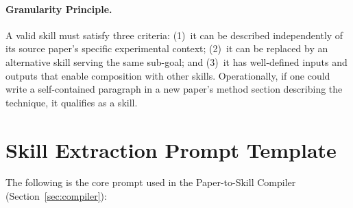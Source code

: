 \paragraph{Granularity Principle.}
A valid skill must satisfy three criteria: (1)~it can be described independently of its source paper's specific experimental context; (2)~it can be replaced by an alternative skill serving the same sub-goal; and (3)~it has well-defined inputs and outputs that enable composition with other skills. Operationally, if one could write a self-contained paragraph in a new paper's method section describing the technique, it qualifies as a skill.

\section{Skill Extraction Prompt Template}
\label{app:extraction_prompt}

The following is the core prompt used in the Paper-to-Skill Compiler (Section~\ref{sec:compiler}):

